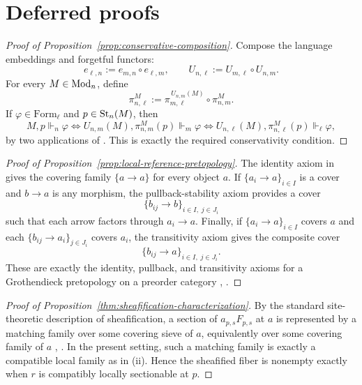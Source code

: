 \appendix
\section{Deferred proofs}\label{app:deferred-proofs}

\begin{proof}[Proof of Proposition~\ref{prop:conservative-composition}]
Compose the language embeddings and forgetful functors:
\[
e_{\ell,n}:=e_{m,n}\circ e_{\ell,m},
\qquad
U_{n,\ell}:=U_{m,\ell}\circ U_{n,m}.
\]
For every $M\in\mathrm{Mod}_n$, define
\[
\pi^M_{n,\ell}:=
\pi^{\,U_{n,m}(M)}_{m,\ell}\circ \pi^M_{n,m}.
\]
If $\varphi\in\mathrm{Form}_\ell$ and $p\in\mathrm{St}_n(M)$, then
\[
M,p\Vdash_n\varphi
\Longleftrightarrow
U_{n,m}(M),\pi^M_{n,m}(p)\Vdash_m\varphi
\Longleftrightarrow
U_{n,\ell}(M),\pi^M_{n,\ell}(p)\Vdash_\ell\varphi,
\]
by two applications of . This is exactly the required conservativity condition.
\end{proof}

\begin{proof}[Proof of Proposition~\ref{prop:local-reference-pretopology}]
The identity axiom in  gives the covering family $\{a\to a\}$ for every object $a$. If $\{a_i\to a\}_{i\in I}$ is a cover and $b\to a$ is any morphism, the pullback-stability axiom provides a cover
\[
\{b_{ij}\to b\}_{i\in I,\;j\in J_i}
\]
such that each arrow factors through $a_i\to a$. Finally, if $\{a_i\to a\}_{i\in I}$ covers $a$ and each $\{b_{ij}\to a_i\}_{j\in J_i}$ covers $a_i$, the transitivity axiom gives the composite cover
\[
\{b_{ij}\to a\}_{i\in I,\;j\in J_i}.
\]
These are exactly the identity, pullback, and transitivity axioms for a Grothendieck pretopology on a preorder category \cite[Chap.~III, \S2]{MacLaneMoerdijk1994}, \cite[Part~B2.1]{Johnstone2002}.
\end{proof}

\begin{proof}[Proof of Proposition~\ref{thm:sheafification-characterization}]
By the standard site-theoretic description of sheafification, a section of
$a_{p,s}F_{p,s}$ at $a$ is represented by a matching family over some
covering sieve of $a$, equivalently over some covering family of $a$
\cite[Chap.~III, \S2]{MacLaneMoerdijk1994}, \cite[Part~B2.2]{Johnstone2002}.
In the present setting, such a matching family is exactly a compatible local
family as in (ii). Hence the sheafified fiber is
nonempty exactly when $r$ is compatibly locally sectionable at $p$.
\end{proof}

